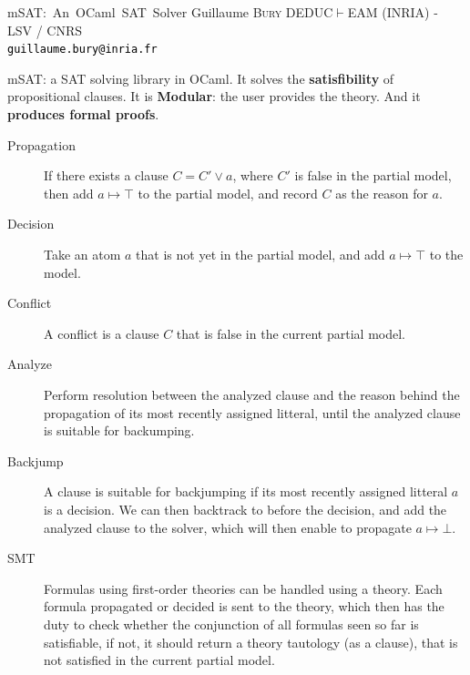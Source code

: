 \documentclass[portrait,a0,final]{a0poster}
\def\msat{\textsf{mSAT}}
\begin{document}
\sffamily %

\postertitle
{\msat{}:~An~OCaml~SAT~Solver}
{Guillaume \textsc{Bury}}
{DEDUC$\vdash$EAM (INRIA) - LSV / CNRS\\
\Large \textcolor{black}{\texttt{guillaume.bury@inria.fr}}}

\begin{center}

\begin{multicols}{2}

{
  \vspace{0.5cm} %

  \msat{}: a SAT solving library in OCaml. It solves the \textbf{satisfibility}
  of propositional clauses. It is \textbf{Modular}: the user provides
  the theory. And it \textbf{produces formal proofs}.
}

{
  \begin{description}
    \item[Propagation] If there exists a clause $C = C' \lor a$, where
      $C'$ is false in the partial model, then add $a \mapsto \top$ to
      the partial model, and record $C$ as the reason for $a$.
    \item[Decision] Take an atom $a$ that is not yet in the partial model,
      and add $a \mapsto \top$ to the model.
    \item[Conflict] A conflict is a clause $C$ that is false in the current partial
      model.
    \item[Analyze] Perform resolution between the analyzed clause and the reason
      behind the propagation of its most recently assigned litteral, until
      the analyzed clause is suitable for backumping.
    \item[Backjump] A clause is suitable for backjumping if its most recently
      assigned litteral $a$ is a decision. We can then backtrack to before the
      decision, and add the analyzed clause to the solver, which will then enable
      to propagate $a \mapsto \bot$.
    \item[SMT] Formulas using first-order theories can be handled using a theory.
      Each formula propagated or decided is sent to the theory, which then
      has the duty to check whether the conjunction of all formulas seen so
      far is satisfiable, if not, it should return a theory tautology (as a clause),
      that is not satisfied in the current partial model.
  \end{description}
}


\end{multicols}
\end{center}
\end{document}
